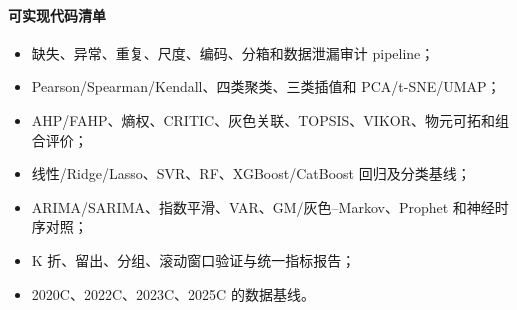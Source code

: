 \paragraph{可实现代码清单}
\begin{itemize}
  \item 缺失、异常、重复、尺度、编码、分箱和数据泄漏审计 pipeline；
  \item Pearson/Spearman/Kendall、四类聚类、三类插值和 PCA/t-SNE/UMAP；
  \item AHP/FAHP、熵权、CRITIC、灰色关联、TOPSIS、VIKOR、物元可拓和组合评价；
  \item 线性/Ridge/Lasso、SVR、RF、XGBoost/CatBoost 回归及分类基线；
  \item ARIMA/SARIMA、指数平滑、VAR、GM/灰色--Markov、Prophet 和神经时序对照；
  \item K 折、留出、分组、滚动窗口验证与统一指标报告；
  \item 2020C、2022C、2023C、2025C 的数据基线。
\end{itemize}

